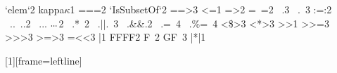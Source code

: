{   {`elem`}{{\symbmath{\in}}}2 {kappa}{{\ensuremath{\kappa}}}1 {===}{{\symbmath{\equiv}}}2
   {`IsSubsetOf`}{{\symbmath{\subseteq}}}2
   {==>}{{\symbmath{\Longrightarrow}}}{3}
   {<=}{{\symbmath{\leq}}}1 {=>}{{\symbmath{\Rightarrow}}}2  {=~=}{{\symbmath{\cong}}}2
   {\ .}{{\symbmath{\circ}}}3 {\ .\ }{{\symbmath{\circ}}}3 {:=:}{{\symbmath{\approx}}}2
   {\ ..}{{{\color{symb}\ .\!\!.}}}2
   {\ ...}{{\ensuremath{\ .\hspace{-.1ex}.\hspace{-.1ex}.}}}2
   {\ .*}{{\ \symbmath{\bullet}}}{2}
   {\ .||.}{{\ \symbmath{\vee}}}3 {\ .&&.}{{\symbmath{\ \wedge}}}2
   {\ .=}{{\ \symbmath{{:}{=}}}}4
   {\ .\%=}{{\ \symbmath{{:}{\Leftarrow}}}}4
   {<\$>}{{\symbmath{{<}\!{\text{\textdollar}}\!{>}}}}3
   {<*>}{{\symbmath{{<}\!\!\!\ast\!\!\!{>}}}}3
   {>>}{{\symbmath{\gg}}}1 {>>=}{{\symbmath{\gg\mkern-6.5mu=}}}3
   {>>>}{{\symbmath{>\!>\!>}}}3
   {>=>}{{\symbmath{\moncompose}}}3
   {=<<}{{\symbmath{=\mkern-6.5mu\ll}}}3
   {|}{{\symbmath{\mid}}}1
   {FF}{{FF}}2
   {F\ }{{}}2
   {GF\ }{{}}3
   {|*|}{{\symbmath{\otimes}}}1
}

[1][frame=leftline]{\lstset{xleftmargin=7.5mm,framexleftmargin=7.5mm,language=Haskell, #1}}{}

